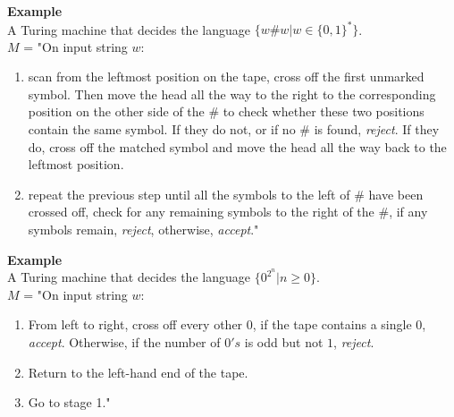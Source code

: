 \documentclass[11pt]{article}
\begin{document}
\begin{mdframed}[backgroundcolor=light-blue]
\textbf{Example}\\
A Turing machine that decides the language $\{w\#w| w \in \{0,1\}^*\}$.\\
$M$ = "On input string $w$:
\begin{enumerate}
\item scan from the leftmost position on the tape, cross off the first
  unmarked symbol. Then move the head all the way to the right to the
  corresponding position on the other side of the $\#$ to check
  whether these two positions contain the same symbol. If they do not,
  or if no $\#$ is found, \emph{reject}. If they do, cross off the
  matched symbol and move the head all the way back to the leftmost position.
\item repeat the previous step until all the symbols to the left of
  $\#$ have been crossed off, check for any remaining symbols to the
  right of the $\#$, if any symbols remain, \emph{reject}, otherwise,
  \emph{accept}."
\end{enumerate}

\end{mdframed}

\begin{mdframed}[backgroundcolor=light-blue]
\textbf{Example}\\
A Turing machine that decides the language $\{0^{2^n} | n \geq 0\}$.\\
$M$ = "On input string $w$:
\begin{enumerate}
\item From left to right, cross off every other $0$, if the tape contains
  a single $0$, \emph{accept}. Otherwise, if the number of $0's$ is
  odd but not $1$, \emph{reject}. 
\item Return to the left-hand end of the tape.
\item Go to stage 1."
\end{enumerate}
\end{mdframed}
\end{document}
